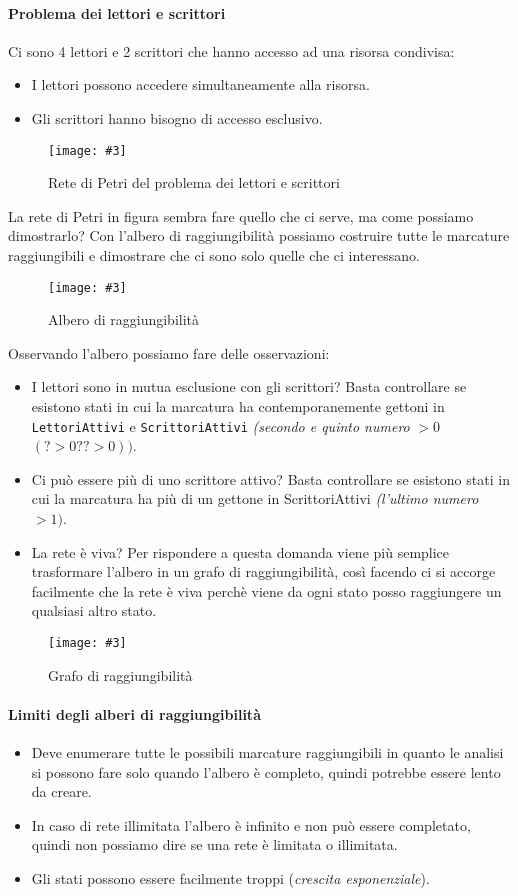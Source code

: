 \documentclass[12pt, twoside, letterpaper]{article}
\newcommand{\img}[3] {
	\begin{figure}[h]
		\caption{#1}
		\centering
		\texttt{[image: \#3]}\\
	\end{figure}
}
\begin{document}
			\paragraph{Problema dei lettori e scrittori}
				Ci sono 4 lettori e 2 scrittori che hanno accesso ad una risorsa condivisa: 
				\begin{itemize}
					\item I lettori possono accedere simultaneamente alla risorsa.
					\item Gli scrittori hanno bisogno di accesso esclusivo.
				\end{itemize}
				\img{Rete di Petri del problema dei lettori e scrittori}{0.4}{img/scrittori.png}
				La rete di Petri in figura sembra fare quello che ci serve, ma come possiamo dimostrarlo? Con l'albero di raggiungibilità possiamo costruire tutte le marcature raggiungibili e dimostrare che ci sono solo quelle che ci interessano.
				\img{Albero di raggiungibilità}{0.4}{img/albero_scr.png}
				\newpage
				Osservando l'albero possiamo fare delle osservazioni:
				\begin{itemize}
					\item I lettori sono in mutua esclusione con gli scrittori? Basta controllare se esistono stati in cui la marcatura ha contemporanemente gettoni in \texttt{LettoriAttivi} e \texttt{ScrittoriAttivi} \textit{(secondo e quinto numero} $>0$ $(?>0??>0))$. 
					\item Ci può essere più di uno scrittore attivo? Basta controllare se esistono stati in cui la marcatura ha più di un gettone in ScrittoriAttivi \textit{(l'ultimo numero} $>1)$.
					\item La rete è viva? Per rispondere a questa domanda viene più semplice trasformare l'albero in un grafo di raggiungibilità, così facendo ci si accorge facilmente che la rete è viva perchè viene da ogni stato posso raggiungere un qualsiasi altro stato.
				\end{itemize}
				\img{Grafo di raggiungibilità}{0.4}{img/grafo_scr.png}
			
			\paragraph{Limiti degli alberi di raggiungibilità}
				\begin{itemize}
					\item Deve enumerare tutte le possibili marcature raggiungibili in quanto le analisi si possono fare solo quando l'albero è completo, quindi potrebbe essere lento da creare. 
					\item In caso di rete illimitata l'albero è infinito e non può essere completato, quindi non possiamo dire se una rete è limitata o illimitata.
					\item Gli stati possono essere facilmente troppi (\textit{crescita esponenziale}).
				\end{itemize}
				
\end{document}
